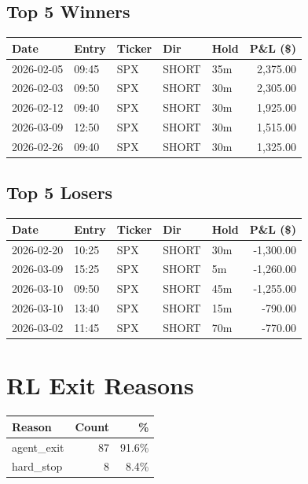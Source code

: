 \documentclass[11pt,a4paper,twoside]{article}
\begin{document}
\subsection*{Top 5 Winners}
\noindent\begin{center}
\begin{tabular}{>{\color{txtmain}}l llll r}
\toprule
\rowcolor{cardbg}
\textbf{Date} & \textbf{Entry} & \textbf{Ticker} & \textbf{Dir} & \textbf{Hold} & \textbf{P\&L (\$)} \\
\midrule
2026-02-05 & 09:45 & SPX & SHORT & 35m & \textcolor{wingreen}{2,375.00} \\
2026-02-03 & 09:50 & SPX & SHORT & 30m & \textcolor{wingreen}{2,305.00} \\
2026-02-12 & 09:40 & SPX & SHORT & 30m & \textcolor{wingreen}{1,925.00} \\
2026-03-09 & 12:50 & SPX & SHORT & 30m & \textcolor{wingreen}{1,515.00} \\
2026-02-26 & 09:40 & SPX & SHORT & 30m & \textcolor{wingreen}{1,325.00} \\
\bottomrule
\end{tabular}
\end{center}
\subsection*{Top 5 Losers}
\noindent\begin{center}
\begin{tabular}{>{\color{txtmain}}l llll r}
\toprule
\rowcolor{cardbg}
\textbf{Date} & \textbf{Entry} & \textbf{Ticker} & \textbf{Dir} & \textbf{Hold} & \textbf{P\&L (\$)} \\
\midrule
2026-02-20 & 10:25 & SPX & SHORT & 30m & \textcolor{lossred}{-1,300.00} \\
2026-03-09 & 15:25 & SPX & SHORT & 5m & \textcolor{lossred}{-1,260.00} \\
2026-03-10 & 09:50 & SPX & SHORT & 45m & \textcolor{lossred}{-1,255.00} \\
2026-03-10 & 13:40 & SPX & SHORT & 15m & \textcolor{lossred}{-790.00} \\
2026-03-02 & 11:45 & SPX & SHORT & 70m & \textcolor{lossred}{-770.00} \\
\bottomrule
\end{tabular}
\end{center}
\clearpage
\section*{RL Exit Reasons}
\noindent\begin{center}
\begin{tabular}{>{\color{txtmain}}l rr}
\toprule
\rowcolor{cardbg}
\textbf{Reason} & \textbf{Count} & \textbf{\%} \\
\midrule
agent\_exit & 87 & 91.6\% \\
hard\_stop & 8 & 8.4\% \\
\bottomrule
\end{tabular}
\end{center}
\end{document}
